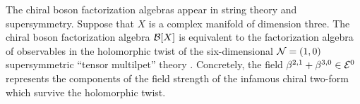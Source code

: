 \documentclass[11pt]{amsart}
\newcommand{\fields}{\cE}
\begin{document}
%
%

The chiral boson factorization algebras appear in string theory and supersymmetry.
Suppose that $X$ is a complex manifold of dimension three.
The chiral boson factorization algebra $\mathcal B[X]$ is equivalent to the factorization algebra of observables in the holomorphic twist of the six-dimensional $\mathcal N=(1,0)$ supersymmetric ``tensor multilpet'' theory \cite{SWtensor}.
Concretely, the field $\beta^{2,1} + \beta^{3,0} \in \mathcal E^{0}$ represents the components of the field strength of the infamous chiral two-form \cite{WittenM5} which survive the holomorphic twist.
\end{document}
